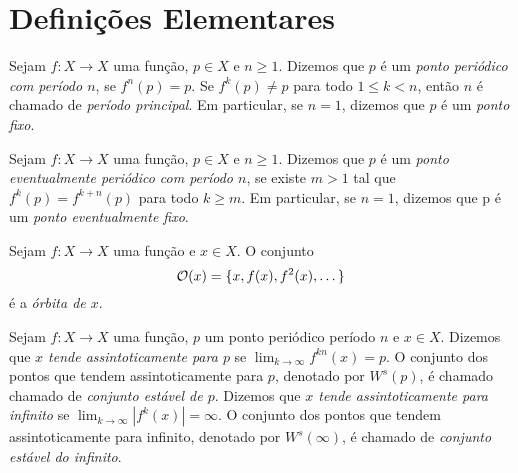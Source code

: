 \section{Definições Elementares}

 
\begin{definition}
Sejam $f: X \to X$ uma função, $p \in X$ e $n \geq 1$.  Dizemos que $p$ é um \textit{ponto periódico com período $n$}, se $f^n(p) = p$. Se $f^k(p) \neq p$ para todo $1 \leq k < n$, então $n$ é chamado de \textit{período principal}. Em particular, se $n=1$, dizemos que $p$ é um \textit{ponto fixo}.%
\end{definition}

\begin{definition}
Sejam $f: X \to X$ uma função, $p \in X$ e $n \geq 1$. Dizemos que $p$ é um \textit{ponto eventualmente periódico com período $n$}, se existe $m > 1$ tal que $f^k(p) = f^{k+n}(p)$ para todo $k \geq m$. Em particular, se $n = 1$, dizemos que p é um \textit{ponto eventualmente fixo}.
\end{definition}

\begin{definition}
Sejam $f:X \to X$ uma função e $x \in X$. O conjunto $$\mathcal{O}(x) = \lbrace x, f(x), f^2(x), \dots \rbrace$$ é a \textit{órbita de $x$}.
\end{definition}

\begin{definition}
Sejam $f: X \to X$ uma função, $p$ um ponto periódico período $n$ e $x \in X$. Dizemos que \textit{$x$ tende assintoticamente para $p$} se $\lim_{k \to \infty} f^{kn}(x) = p$. O conjunto dos pontos que tendem assintoticamente para $p$, denotado por $W^s(p)$, é chamado chamado de \textit{conjunto estável de $p$}. Dizemos que \textit{$x$ tende assintoticamente para infinito} se $\lim_{k \to \infty} |f^{k}(x)| = \infty$. O conjunto dos pontos que tendem assintoticamente para infinito, denotado por $W^s(\infty)$, é chamado de \textit{conjunto estável do infinito}.
\end{definition}

